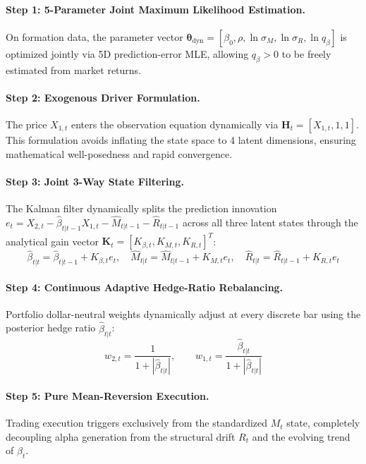 \documentclass[11pt, a4paper]{article}
\begin{document}
\paragraph{Step 1: 5-Parameter Joint Maximum Likelihood Estimation.}
On formation data, the parameter vector $\bm{\theta}_{\text{dyn}} = [\beta_0, \rho, \ln\sigma_M, \ln\sigma_R, \ln q_\beta]$ is optimized jointly via 5D prediction-error MLE, allowing $q_\beta > 0$ to be freely estimated from market returns.

\paragraph{Step 2: Exogenous Driver Formulation.}
The price $X_{1,t}$ enters the observation equation dynamically via $\mathbf{H}_t = [X_{1,t}, 1, 1]$. This formulation avoids inflating the state space to 4 latent dimensions, ensuring mathematical well-posedness and rapid convergence.

\paragraph{Step 3: Joint 3-Way State Filtering.}
The Kalman filter dynamically splits the prediction innovation $e_t = X_{2,t} - \hat{\beta}_{t|t-1} X_{1,t} - \hat{M}_{t|t-1} - \hat{R}_{t|t-1}$ across all three latent states through the analytical gain vector $\mathbf{K}_t = [K_{\beta, t}, K_{M, t}, K_{R, t}]^T$:
\begin{equation}
    \hat{\beta}_{t|t} = \hat{\beta}_{t|t-1} + K_{\beta, t} e_t, \quad \hat{M}_{t|t} = \hat{M}_{t|t-1} + K_{M, t} e_t, \quad \hat{R}_{t|t} = \hat{R}_{t|t-1} + K_{R, t} e_t
\end{equation}

\paragraph{Step 4: Continuous Adaptive Hedge-Ratio Rebalancing.}
Portfolio dollar-neutral weights dynamically adjust at every discrete bar using the posterior hedge ratio $\hat{\beta}_{t|t}$:
\begin{equation}
    w_{2,t} = \frac{1}{1 + |\hat{\beta}_{t|t}|}, \qquad w_{1,t} = \frac{\hat{\beta}_{t|t}}{1 + |\hat{\beta}_{t|t}|}
\end{equation}

\paragraph{Step 5: Pure Mean-Reversion Execution.}
Trading execution triggers exclusively from the standardized $M_t$ state, completely decoupling alpha generation from the structural drift $R_t$ and the evolving trend of $\beta_t$.
\end{document}
